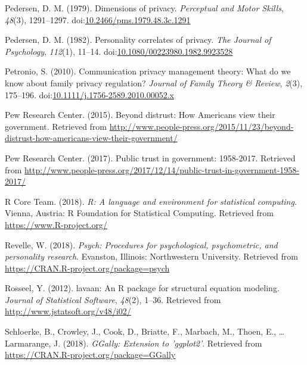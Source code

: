\documentclass[man,floatsintext]{apa6}
\begin{document}
\leavevmode\hypertarget{ref-Pedersen.1979}{}%
Pedersen, D. M. (1979). Dimensions of privacy. \emph{Perceptual and Motor Skills}, \emph{48}(3), 1291--1297. doi:\href{https://doi.org/10.2466/pms.1979.48.3c.1291}{10.2466/pms.1979.48.3c.1291}

\leavevmode\hypertarget{ref-Pedersen.1982}{}%
Pedersen, D. M. (1982). Personality correlates of privacy. \emph{The Journal of Psychology}, \emph{112}(1), 11--14. doi:\href{https://doi.org/10.1080/00223980.1982.9923528}{10.1080/00223980.1982.9923528}

\leavevmode\hypertarget{ref-Petronio.2010}{}%
Petronio, S. (2010). Communication privacy management theory: What do we know about family privacy regulation? \emph{Journal of Family Theory \& Review}, \emph{2}(3), 175--196. doi:\href{https://doi.org/10.1111/j.1756-2589.2010.00052.x}{10.1111/j.1756-2589.2010.00052.x}

\leavevmode\hypertarget{ref-PewResearchCenter.2015c}{}%
Pew Research Center. (2015). Beyond distrust: How Americans view their government. Retrieved from \url{http://www.people-press.org/2015/11/23/beyond-distrust-how-americans-view-their-government/}

\leavevmode\hypertarget{ref-PewResearchCenter.2017}{}%
Pew Research Center. (2017). Public trust in government: 1958-2017. Retrieved from \url{http://www.people-press.org/2017/12/14/public-trust-in-government-1958-2017/}

\leavevmode\hypertarget{ref-R-base}{}%
R Core Team. (2018). \emph{R: A language and environment for statistical computing}. Vienna, Austria: R Foundation for Statistical Computing. Retrieved from \url{https://www.R-project.org/}

\leavevmode\hypertarget{ref-R-psych}{}%
Revelle, W. (2018). \emph{Psych: Procedures for psychological, psychometric, and personality research}. Evanston, Illinois: Northwestern University. Retrieved from \url{https://CRAN.R-project.org/package=psych}

\leavevmode\hypertarget{ref-R-lavaan}{}%
Rosseel, Y. (2012). lavaan: An R package for structural equation modeling. \emph{Journal of Statistical Software}, \emph{48}(2), 1--36. Retrieved from \url{http://www.jstatsoft.org/v48/i02/}

\leavevmode\hypertarget{ref-R-GGally}{}%
Schloerke, B., Crowley, J., Cook, D., Briatte, F., Marbach, M., Thoen, E., \ldots{} Larmarange, J. (2018). \emph{GGally: Extension to 'ggplot2'}. Retrieved from \url{https://CRAN.R-project.org/package=GGally}
\end{document}
